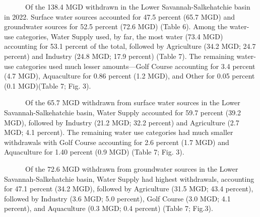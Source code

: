\documentclass[
]{article}
\begin{document}
~~~~~~Of the 138.4 MGD withdrawn in the Lower Savannah-Salkehatchie
basin in 2022. Surface water sources accounted for 47.5 percent (65.7
MGD) and groundwater sources for 52.5 percent (72.6 MGD) (Table 6).
Among the water-use categories, Water Supply used, by far, the most
water (73.4 MGD) accounting for 53.1 percent of the total, followed by
Agriculture (34.2 MGD; 24.7 percent) and Industry (24.8 MGD; 17.9
percent) (Table 7). The remaining water-use categories used much lesser
amounts---Golf Course accounting for 3.4 percent (4.7 MGD), Aquaculture
for 0.86 percent (1.2 MGD), and Other for 0.05 percent (0.1 MGD)(Table
7; Fig. 3).

~~~~~~Of the 65.7 MGD withdrawn from surface water sources in the Lower
Savannah-Salkehatchie basin, Water Supply accounted for 59.7 percent
(39.2 MGD), followed by Industry (21.2 MGD; 32.2 percent) and
Agriculture (2.7 MGD; 4.1 percent). The remaining water use categories
had much smaller withdrawals with Golf Course accounting for 2.6 percent
(1.7 MGD) and Aquaculture for 1.40 percent (0.9 MGD) (Table 7; Fig. 3).

~~~~~~Of the 72.6 MGD withdrawn from groundwater sources in the Lower
Savannah-Salkehatchie basin, Water Supply had highest withdrawals,
accounting for 47.1 percent (34.2 MGD), followed by Agriculture (31.5
MGD; 43.4 percent), followed by Industry (3.6 MGD; 5.0 percent), Golf
Course (3.0 MGD; 4.1 percent), and Aquaculture (0.3 MGD; 0.4 percent)
(Table 7; Fig.3).
\end{document}
